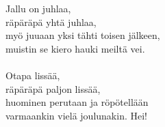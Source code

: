 
            Jallu on juhlaa, \\
            räpäräpä yhtä juhlaa, \\
            myö juuaan yksi tähti toisen jälkeen, \\
            muistin se kiero hauki meiltä vei. \\
\hspace{10mm} \\
            Otapa lissää, \\
            räpäräpä paljon lissää, \\
            huominen perutaan ja röpötellään \\
            varmaankin vielä joulunakin. Hei! \\
